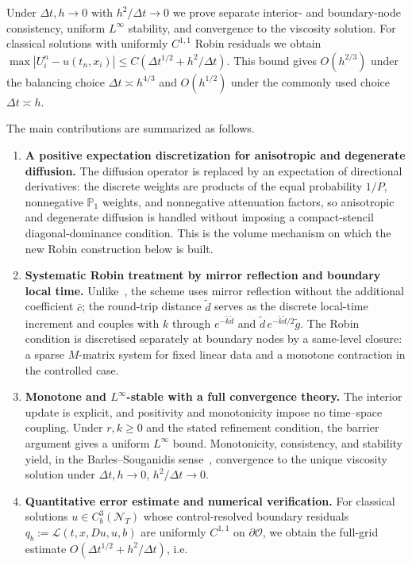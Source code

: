 \documentclass[11pt]{article}
\theoremstyle{definition}
\theoremstyle{remark}
\newcommand{\cO}{\mathcal{O}}
\newcommand{\dt}{\Delta t}
\begin{document}
Under $\dt,h\to0$ with $h^2/\dt\to0$ we prove separate interior- and
boundary-node consistency, uniform $L^\infty$ stability, and convergence to
the viscosity solution.  For classical solutions with uniformly $C^{1,1}$
Robin residuals we obtain
$\max|U_i^n-u(t_n,x_i)|\le C(\dt^{1/2}+h^2/\dt)$.  This bound gives
$O(h^{2/3})$ under the balancing choice $\dt\asymp h^{4/3}$ and
$O(h^{1/2})$ under the commonly used choice $\dt\asymp h$.

The main contributions are summarized as follows.
\begin{enumerate}[label=(\roman*)]
	\item \textbf{A positive expectation discretization for anisotropic and
	degenerate diffusion.}  The diffusion
	operator is replaced by an expectation of directional derivatives: the
	discrete weights are products of the equal probability $1/P$, nonnegative
	$\mathbb P_1$ weights, and nonnegative attenuation factors, so anisotropic
	and degenerate diffusion is handled without imposing a compact-stencil
	diagonal-dominance condition.  This is the volume mechanism on which the new
	Robin construction below is built.
	\item \textbf{Systematic Robin treatment by mirror reflection and boundary
		local time.}  Unlike~\cite{CalzolaEtAl2023}, the scheme uses mirror reflection
	without the additional coefficient $\bar c$; the round-trip distance
	$\widetilde d$ serves as
	the discrete local-time increment and couples with $k$ through
	$e^{-\widetilde k\widetilde d}$ and
	$\widetilde d\,e^{-\widetilde k\widetilde d/2}\widetilde g$.  The Robin
	condition is discretised separately at boundary nodes by a same-level
	closure: a sparse $M$-matrix system for fixed linear data and a monotone
	contraction in the controlled case.
	\item \textbf{Monotone and $L^\infty$-stable with a full convergence theory.}
	The interior update is explicit, and positivity and monotonicity impose no
	time--space coupling.  Under $r,k\ge0$ and the stated refinement condition,
	the barrier argument gives a uniform $L^\infty$ bound.  Monotonicity,
	consistency, and stability yield, in the
	Barles--Souganidis sense~\cite{BarlesSouganidis1991}, convergence to the unique viscosity
	solution under $\dt,h\to0$, $h^2/\dt\to0$.
	\item \textbf{Quantitative error estimate and numerical verification.}  For
	classical solutions $u\in C_b^3(\mathcal N_T)$ whose control-resolved boundary
	residuals $q_b:=\mathcal L(t,x,Du,u,b)$ are uniformly $C^{1,1}$ on
	$\partial\cO$, we obtain the full-grid estimate $O(\dt^{1/2}+h^2/\dt)$, i.e.\

\end{enumerate}
\end{document}
